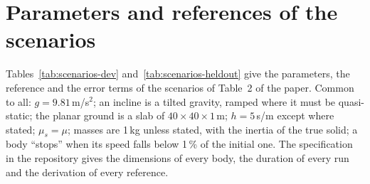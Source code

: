 \section{Parameters and references of the scenarios}\label{sup:scenarios}


Tables~\ref{tab:scenarios-dev} and~\ref{tab:scenarios-heldout} give the parameters, the reference
and the error terms of the scenarios of Table~2 of the paper. Common to
all: $g = 9.81$\,m/s$^2$; an incline is a tilted gravity, ramped where it must be quasi-static;
the planar ground is a slab of $40\times40\times1$\,m; $h = 5$\,s/m except where stated;
$\mu_s = \mu$; masses are 1\,kg unless stated, with the inertia of the true solid; a body
``stops'' when its speed falls below 1\,\% of the initial one. The specification in the
repository gives the dimensions of every body, the duration of every run and the derivation
of every reference.

